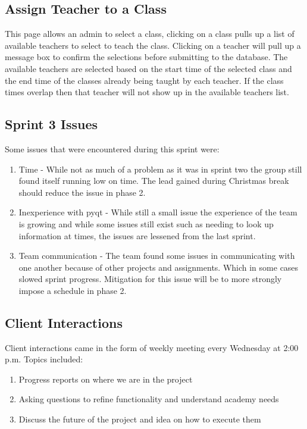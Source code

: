 \subsection{Assign Teacher to a Class}
This page allows an admin to select a class, clicking on a class pulls up a list of available teachers to select to teach the class. Clicking on a teacher will pull up a message box to confirm the selections before submitting to the database. The available teachers are selected based on the start time of the selected class and the end time of the classes already being taught by each teacher. If the class times overlap then that teacher will not show up in the available teachers list.

\subsection{Sprint 3 Issues}
Some issues that were encountered during this sprint were:

\begin{enumerate}
\item Time - While not as much of a problem as it was in sprint two the group still found itself running low on time. The lead gained during Christmas break should reduce the issue in phase 2.
\item Inexperience with pyqt - While still a small issue the experience of the team is growing and while some issues still exist such as needing to look up information at times, the issues are lessened from the last sprint.
\item Team communication - The team found some issues in communicating with one another because of other projects and assignments. Which in some cases slowed sprint progress. Mitigation for this issue will be to more strongly impose a schedule in phase 2.
\end{enumerate}

\subsection{Client Interactions}

Client interactions came in the form of weekly meeting every Wednesday at 2:00 p.m. Topics included:

\begin{enumerate}
\item Progress reports on where we are in the project
\item Asking questions to refine functionality and understand academy needs
\item Discuss the future of the project and idea on how to execute them
\end{enumerate}



